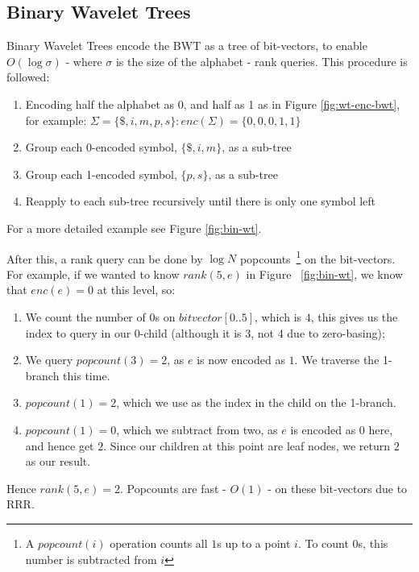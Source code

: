 \subsection{Binary Wavelet Trees}
Binary Wavelet Trees encode the BWT as a tree of bit-vectors, to enable
$O(\log \sigma)$ - where $\sigma$ is the size of the alphabet - rank queries. This procedure is followed:

\begin{enumerate}
    \item Encoding half the alphabet as 0, and half as 1 as in Figure
    \ref{fig:wt-enc-bwt}, for example:
    $\Sigma = \{ \$, i, m, p, s \} : enc(\Sigma) = \{ 0, 0, 0, 1, 1 \}$
    \item Group each 0-encoded symbol, $\{ \$, i, m \}$, as a sub-tree
    \item Group each 1-encoded symbol, $\{ p, s \}$, as a sub-tree
    \item Reapply to each sub-tree recursively until there is only one symbol
    left
\end{enumerate}

For a more detailed example see Figure \ref{fig:bin-wt}.


After this, a rank query can be done by $\log N$ popcounts~\footnote{A
$popcount(i)$ operation counts all $1$s up to a point $i$.
To count $0$s, this number is subtracted from $i$} on the
bit-vectors. For example, if we wanted to know $rank(5, e)$ in Figure
~\ref{fig:bin-wt}, we know that $enc(e) = 0$ at this level, so:
\begin{enumerate}
    \item We count the number of $0$s on $bitvector[0..5]$, which is $4$, this
    gives us the index to query in our 0-child (although it is $3$, not $4$ due
    to zero-basing);
    \item We query $popcount(3) = 2$, as $e$ is now encoded as $1$. We traverse
    the 1-branch this time.
    \item $popcount(1) = 2$, which we use as the index in the child on the
    1-branch.
    \item $popcount(1) = 0$, which we subtract from two, as $e$ is encoded as
    $0$ here, and hence get $2$. Since our children at this point are leaf
    nodes, we return $2$ as our result.
\end{enumerate}
Hence $rank(5, e) = 2$. Popcounts are fast - $O(1)$ - on these bit-vectors due
to RRR.

